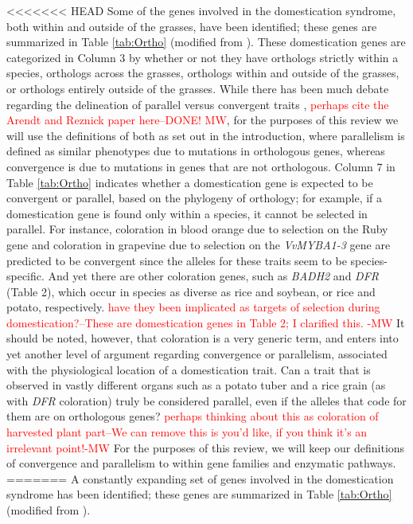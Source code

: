 \documentclass[12pt]{article}
\newcommand{\mbh}[1]{\textcolor{red}{\normalsize  #1}}
\begin{document}
<<<<<<< HEAD
Some of the genes involved in the domestication syndrome, both within and outside of the grasses, have been identified; these genes are summarized in Table \ref{tab:Ortho} (modified from \citep{Lenser2013}).
These domestication genes are categorized in Column 3 by whether or not they have orthologs strictly within a species, orthologs across the grasses, orthologs within and outside of the grasses, or orthologs entirely outside of the grasses.
While there has been much debate regarding the delineation of parallel versus convergent traits \citep{ARENDT2008}, \mbh{perhaps cite the Arendt and Reznick paper here--DONE! MW}, for the purposes of this review we will use the definitions of both as set out in the introduction, where parallelism is defined as similar phenotypes due to mutations in orthologous genes, whereas convergence is due to mutations in genes that are not orthologous.
Column 7 in Table \ref{tab:Ortho} indicates whether a domestication gene is expected to be convergent or parallel, based on the phylogeny of orthology; for example, if a domestication gene is found only within a species, it cannot be selected in parallel.
For instance, coloration in blood orange due to selection on the Ruby gene and coloration in grapevine due to selection on the \textit{VvMYBA1-3} gene are predicted to be convergent since the alleles for these traits seem to be species-specific.
And yet there are other coloration genes, such as \textit{BADH2} and \textit{DFR} (Table 2), which occur in species as diverse as rice and soybean, or rice and potato, respectively. \mbh{have they been implicated as targets of selection during domestication?--These are domestication genes in Table 2; I clarified this. -MW}
It should be noted, however, that coloration is a very generic term, and enters into yet another level of argument regarding convergence or parallelism, associated with the physiological location of a domestication trait.
Can a trait that is observed in vastly different organs such as a potato tuber and a rice grain (as with \textit{DFR} coloration) truly be considered parallel, even if the alleles that code for them are on orthologous genes? \mbh{perhaps thinking about this as coloration of harvested plant part--We can remove this is you'd like, if you think it's an irrelevant point!-MW}
For the purposes of this review, we will keep our definitions of convergence and parallelism to within gene families and enzymatic pathways. 
=======
A constantly expanding set of genes involved in the domestication syndrome has been identified; these genes are summarized in Table \ref{tab:Ortho} (modified from \citep{Lenser2013}).
\end{document}
